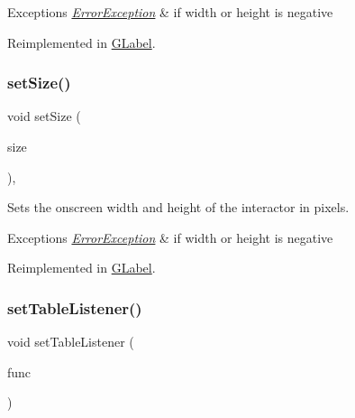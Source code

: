 \begin{DoxyExceptions}{Exceptions}
{\em \mbox{\hyperlink{classErrorException}{Error\+Exception}}} & if width or height is negative \\
\hline
\end{DoxyExceptions}


Reimplemented in \mbox{\hyperlink{classGLabel_ae7e6371aa2311d6f18caf8f7be59704d}{G\+Label}}.

\mbox{\label{classGInteractor_ae2b628228f192c2702c4ce941b2af68f}} 
\subsubsection{\texorpdfstring{set\+Size()}{setSize()}\hspace{0.1cm}{\footnotesize\ttfamily [2/2]}}
{\footnotesize\ttfamily void set\+Size (\begin{DoxyParamCaption}\item[{const \mbox{\hyperlink{classGDimension}{G\+Dimension}} \&}]{size }\end{DoxyParamCaption})\hspace{0.3cm}{\ttfamily [virtual]}, {\ttfamily [inherited]}}



Sets the onscreen width and height of the interactor in pixels. 


\begin{DoxyExceptions}{Exceptions}
{\em \mbox{\hyperlink{classErrorException}{Error\+Exception}}} & if width or height is negative \\
\hline
\end{DoxyExceptions}


Reimplemented in \mbox{\hyperlink{classGLabel_a0fe8cce1a80750f36fa14ee99ca34014}{G\+Label}}.

\mbox{\label{classGTable_aeeb00b5caf01028e9de6f2dd6ef4b9bd}} 
\subsubsection{\texorpdfstring{set\+Table\+Listener()}{setTableListener()}\hspace{0.1cm}{\footnotesize\ttfamily [1/2]}}
{\footnotesize\ttfamily void set\+Table\+Listener (\begin{DoxyParamCaption}\item[{G\+Event\+Listener}]{func }\end{DoxyParamCaption})\hspace{0.3cm}{\ttfamily [virtual]}}



